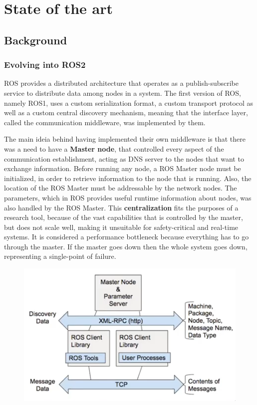 \section{State of the art}\label{c:sota}


\subsection{Background}\label{s:back}


\subsubsection{Evolving into ROS2}

ROS provides a distributed architecture that operates as a publish-subscribe service to distribute data among nodes in a system. The first version of ROS, namely ROS1, uses a custom serialization format, a custom transport protocol as well as a custom central discovery mechanism, meaning that the interface layer, called the communication middleware, was implemented by them. 
            
The main ideia behind having implemented their own middleware is that there was a need to have a \textbf{Master node}, that controlled every aspect of the communication establishment, acting as DNS server to the nodes that want to exchange information. Before running any node, a ROS Master node must be initialized, in order to retrieve information to the node that is running. Also, the location of the ROS Master must be addressable by the network nodes. The parameters, which in ROS provides useful runtime information about nodes, was also handled by the ROS Master. This \textbf{centralization} fits the purposes of a research tool, because of the vast capabilities that is controlled by the master, but does not scale well, making it unsuitable for safety-critical and real-time systems. It is considered a performance bottleneck because everything has to go through the master. If the master goes down then the whole system goes down, representing a single-point of failure.  

\begin{figure}[H]
        \centering
         \includegraphics[width=0.5\linewidth]{images/former-ros1-architecture.png}
\end{figure}

